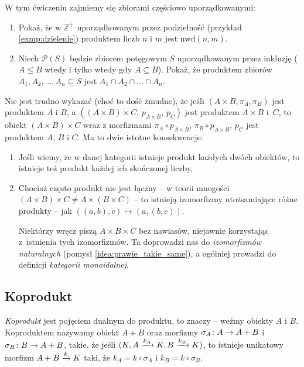 \begin{exc}
  W tym ćwiczeniu zajmiemy się zbiorami częściowo uporządkowanymi:
  \begin{enumerate}
    \item Pokaż, że w $\mathbb Z^+$ uporządkowanym przez podzielność (przykład \ref{exmp:dzielenie}) produktem liczb $n$ i $m$ jest $\mathrm{nwd}(n, m)$.
    \item Niech $\mathcal P(S)$ będzie zbiorem potęgowym $S$ uporządkowanym przez inkluzję ($A\le B$ wtedy i tylko wtedy gdy $A\subseteq B$). Pokaż, że produktem zbiorów $A_1, A_2, \dots, A_n\subseteq S$ jest $A_1\cap A_2\cap \dots \cap A_n$.
  \end{enumerate}
\end{exc}

\begin{remk}[O łączności]
  Nie jest trudno wykazać (choć to dość żmudne), że jeśli $(A\times B, \pi_A, \pi_B)$ jest produktem $A$ i $B$, a $((A\times B)\times C,\, p_{A\times B},\, p_C)$ jest produktem $A\times B$ i~$C$, to obiekt $(A\times B)\times C$ wraz z morfizmami $\pi_A\circ p_{A\times B},\, \pi_B\circ p_{A\times B},\, p_C$
  jest produktem $A$, $B$ i $C$. Ma to dwie istotne konsekwencje:
  \begin{enumerate}
    \item Jeśli wiemy, że w danej kategorii istnieje produkt każdych dwóch obiektów, to istnieje też produkt każdej ich skończonej liczby,
    \item Chociaż często produkt nie jest łączny -- w teorii mnogości $(A\times B)\times C\neq A\times (B\times C)$ -- to istnieją izomorfizmy utożsamiające różne produkty -- jak $((a, b), c)\mapsto (a, (b, c))$.

    Niektórzy wręcz piszą $A\times B\times C$ bez nawiasów, niejawnie korzystając z~istnienia tych izomorfizmów. Ta doprowadzi nas do \emph{izomorfizmów naturalnych} (pomysł \ref{idea:prawie_takie_same}), a ogólniej prowadzi do definicji \emph{kategorii monoidalnej}.
  \end{enumerate}
\end{remk}

\subsection{Koprodukt}
\begin{defn}
  \emph{Koprodukt} jest pojęciem dualnym do produktu, to znaczy -- weźmy obiekty $A$ i $B$. Koproduktem nazywamy obiekt $A+B$ oraz morfizmy $\morph{\sigma_A} A{A+B}$ i $\morph{\sigma_B}B{A+B}$, takie, że jeśli $(K, \morpharr {k_A}AK, \morpharr {k_B}BK)$, to istnieje unikatowy morfizm $\morpharr k{A+B}K$ taki, że $k_A = k \circ \sigma_A$ i $k_B = k\circ \sigma_B$.
\end{defn}

